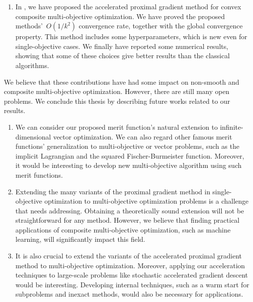 \documentclass[../main]{subfiles}
\begin{document}
\begin{enumerate}
    \item In , we have proposed the accelerated proximal gradient method for convex composite multi-objective optimization.
        We have proved the proposed methods'~$O(1 / k^2)$ convergence rate, together with the global convergence property.
        This method includes some hyperparameters, which is new even for single-objective cases.
        We finally have reported some numerical results, showing that some of these choices give better results than the classical algorithms.
\end{enumerate}

We believe that these contributions have had some impact on non-smooth and composite multi-objective optimization.
However, there are still many open problems.
We conclude this thesis by describing future works related to our results.
\begin{enumerate}
    \item We can consider our proposed merit function's natural extension to infinite-dimensional vector optimization.
        We can also regard other famous merit functions' generalization to multi-objective or vector problems, such as the implicit Lagrangian and the squared Fischer-Burmeister function.
        Moreover, it would be interesting to develop new multi-objective algorithm using such merit functions.

    \item Extending the many variants of the proximal gradient method in single-objective optimization to multi-objective optimization problems is a challenge that needs addressing.
        Obtaining a theoretically sound extension will not be straightforward for any method.
        However, we believe that finding practical applications of composite multi-objective optimization, such as machine learning, will significantly impact this field.

    \item It is also crucial to extend the variants of the accelerated proximal gradient method to multi-objective optimization.
        Moreover, applying our acceleration techniques to large-scale problems like stochastic accelerated gradient descent would be interesting.
        Developing internal techniques, such as a warm start for subproblems and inexact methods, would also be necessary for applications.
\end{enumerate}
\end{document}
